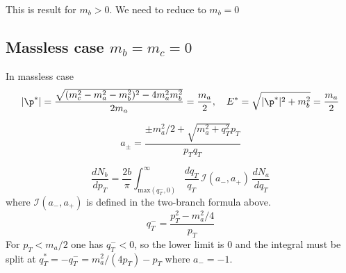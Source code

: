This is result for $m_b>0$. We need to reduce to $m_b=0$

\subsection{Massless case  $m_b=m_c=0$}

In massless case
\begin{equation}
|\p^*| = \frac{\sqrt{(m_c^2-m_a^2-m_b^2)^2-4 m_a^2 m_b^2}}{2m_a}=\frac{m_a}{2}, \quad E^{*} = \sqrt{|\p^*|^2+m_b^2}=\frac{m_a}{2}
\end{equation}

\begin{equation}
    a_{\pm}= \frac{\pm m^2_a/2 +\sqrt{m_a^2+q_T^2}p_{T}}{p_T q_T}
\end{equation}

\begin{equation}
		\frac{dN_b}{dp_T} =\frac{2b}{\pi}
	\int_{\text{max}(q_T^-,0)}^{\infty} \frac{ dq_T}{ q_T}\, \mathcal{I}(a_-,a_+)\,\frac{dN_a}{ dq_T}
\end{equation}
where $\mathcal{I}(a_-,a_+)$ is defined in the two-branch formula above.
\begin{equation}
    q_T^- = \frac{p_T^2-m_a^2/4}{p_T}
\end{equation}
For $p_T < m_a/2$ one has $q_T^- < 0$, so the lower limit is $0$ and the integral must be split at $q_T^* = -q_T^- = m_a^2/(4p_T) - p_T$ where $a_-=-1$.

